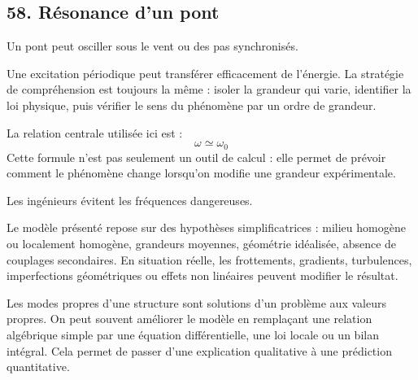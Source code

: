 \documentclass[11pt,a4paper]{article}
\begin{document}
\subsection{58. Résonance d'un pont}

\begin{exemplebox}
Un pont peut osciller sous le vent ou des pas synchronisés.
\end{exemplebox}

\begin{methodebox}
Une excitation périodique peut transférer efficacement de l'énergie.
La stratégie de compréhension est toujours la même : isoler la grandeur qui varie, identifier la loi physique, puis vérifier le sens du phénomène par un ordre de grandeur.
\end{methodebox}

\begin{theorembox}
La relation centrale utilisée ici est :
\[
\omega\simeq\omega_0
\]
Cette formule n'est pas seulement un outil de calcul : elle permet de prévoir comment le phénomène change lorsqu'on modifie une grandeur expérimentale.
\end{theorembox}

\begin{odgbox}
Les ingénieurs évitent les fréquences dangereuses.
\end{odgbox}

\begin{attentionbox}
Le modèle présenté repose sur des hypothèses simplificatrices : milieu homogène ou localement homogène, grandeurs moyennes, géométrie idéalisée, absence de couplages secondaires. En situation réelle, les frottements, gradients, turbulences, imperfections géométriques ou effets non linéaires peuvent modifier le résultat.
\end{attentionbox}

\begin{approfondissementbox}
Les modes propres d'une structure sont solutions d'un problème aux valeurs propres.
On peut souvent améliorer le modèle en remplaçant une relation algébrique simple par une équation différentielle, une loi locale ou un bilan intégral. Cela permet de passer d'une explication qualitative à une prédiction quantitative.
\end{approfondissementbox}
\end{document}
